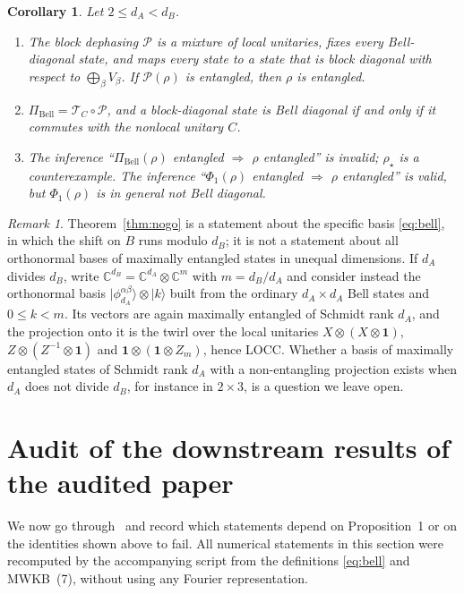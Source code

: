 \documentclass[11pt,a4paper]{article}
\newtheorem{corollary}[theorem]{Corollary}
\theoremstyle{definition}
\theoremstyle{remark}
\newtheorem{remark}[theorem]{Remark}
\newcommand{\ket}[1]{\lvert #1\rangle}
\newcommand{\dA}{d_A}
\newcommand{\dB}{d_B}
\newcommand{\PiB}{\Pi_{\mathrm{Bell}}}
\newcommand{\cP}{\mathcal{P}}
\newcommand{\cC}{\mathcal{T}_{C}}
\newcommand{\id}{\mathbf{1}}
\begin{document}
\begin{corollary}\label{cor:restore}
Let $2\le\dA<\dB$.
\begin{enumerate}
\item[(a)] The block dephasing $\cP$ is a mixture of local unitaries, fixes every
Bell-diagonal state, and maps every state to a state that is block diagonal with respect
to $\bigoplus_\beta V_\beta$. If $\cP(\rho)$ is entangled, then $\rho$ is entangled.
\item[(b)] $\PiB=\cC\circ\cP$, and a block-diagonal state is Bell diagonal if and only if
it commutes with the nonlocal unitary $C$.
\item[(c)] The inference ``$\PiB(\rho)$ entangled $\Rightarrow$ $\rho$ entangled'' is
invalid; $\rho_\star$ is a counterexample. The inference
``$\Phi_1(\rho)$ entangled $\Rightarrow$ $\rho$ entangled'' is valid, but $\Phi_1(\rho)$ is
in general not Bell diagonal.
\end{enumerate}
\end{corollary}

\begin{remark}\label{rem:divisible}
Theorem~\ref{thm:nogo} is a statement about the specific basis \eqref{eq:bell}, in which
the shift on $B$ runs modulo $\dB$; it is not a statement about all orthonormal bases of
maximally entangled states in unequal dimensions. If $\dA$ divides $\dB$, write $\mathbb{C}^{\dB}=\mathbb{C}^{\dA}\otimes\mathbb{C}^{m}$
with $m=\dB/\dA$ and consider instead the orthonormal basis
$\ket{\phi^{\alpha\beta}_{\dA}}\otimes\ket{k}$ built from the ordinary $\dA\times\dA$ Bell
states and $0\le k<m$. Its vectors are again maximally entangled of Schmidt rank $\dA$, and
the projection onto it is the twirl over the local unitaries
$X\otimes(X\otimes\id)$, $Z\otimes(Z^{-1}\otimes\id)$ and $\id\otimes(\id\otimes Z_m)$,
hence LOCC. Whether a basis of maximally entangled states of Schmidt rank $\dA$ with a
non-entangling projection exists when $\dA$ does not divide $\dB$, for instance in
$2\times3$, is a question we leave open.
\end{remark}

\section{Audit of the downstream results of the audited paper}\label{sec:audit}

We now go through~\cite{MWKB24} and record which statements depend on Proposition~1 or on
the identities shown above to fail. All numerical statements in this section were
recomputed by the accompanying script from the definitions \eqref{eq:bell} and
MWKB~(7), without using any Fourier representation.
\end{document}
